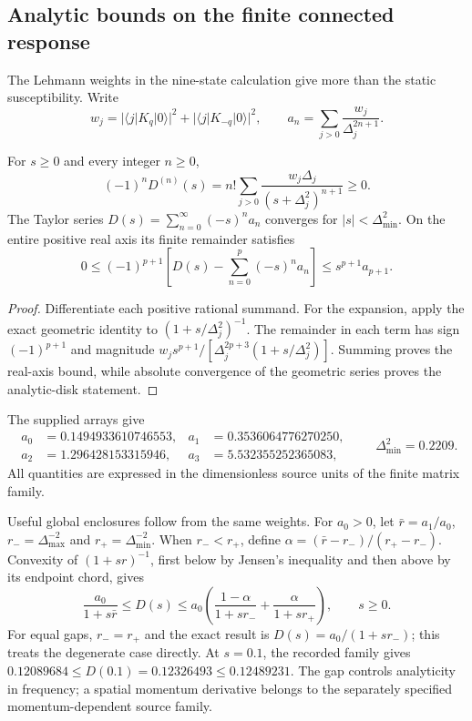 \subsection{Analytic bounds on the finite connected response}
\label{sec:response-bounds}
The Lehmann weights in the nine-state calculation give more than the static susceptibility. Write
\[
w_j=|\langle j|K_q|0\rangle|^2+|\langle j|K_{-q}|0\rangle|^2,
\qquad a_n=\sum_{j>0}\frac{w_j}{\Delta_j^{2n+1}}.
\]
\begin{proposition}\label{prop:stieltjes-response}
For $s\geq0$ and every integer $n\geq0$,
\begin{equation}\label{eq:response-monotonicity}
(-1)^nD^{(n)}(s)=n!\sum_{j>0}\frac{w_j\Delta_j}{(s+\Delta_j^2)^{n+1}}\geq0.
\end{equation}
The Taylor series $D(s)=\sum_{n=0}^\infty(-s)^na_n$ converges for $|s|<\Delta_{\min}^2$. On the entire positive real axis its finite remainder satisfies
\begin{equation}\label{eq:response-remainder}
0\leq(-1)^{p+1}\left[D(s)-\sum_{n=0}^p(-s)^na_n\right]
\leq s^{p+1}a_{p+1}.
\end{equation}
\end{proposition}
\begin{proof}
Differentiate each positive rational summand. For the expansion, apply the exact geometric identity to $(1+s/\Delta_j^2)^{-1}$. The remainder in each term has sign $(-1)^{p+1}$ and magnitude
$w_j s^{p+1}/[\Delta_j^{2p+3}(1+s/\Delta_j^2)]$.
Summing proves the real-axis bound, while absolute convergence of the geometric series proves the analytic-disk statement.
\end{proof}
The supplied arrays give
\begin{equation}\label{eq:response-taylor-numbers}
\begin{aligned}
a_0&=0.1494933610746553,&a_1&=0.3536064776270250,\\
a_2&=1.296428153315946,&a_3&=5.532355252365083,
\end{aligned}
\qquad \Delta_{\min}^2=0.2209.
\end{equation}
All quantities are expressed in the dimensionless source units of the finite matrix family.

Useful global enclosures follow from the same weights. For $a_0>0$, let $\bar r=a_1/a_0$, $r_-=\Delta_{\max}^{-2}$ and $r_+=\Delta_{\min}^{-2}$. When $r_-<r_+$, define $\alpha=(\bar r-r_-)/(r_+-r_-)$. Convexity of $(1+sr)^{-1}$, first below by Jensen's inequality and then above by its endpoint chord, gives
\begin{equation}\label{eq:response-jensen}
\frac{a_0}{1+s\bar r}\leq D(s)\leq
a_0\left(\frac{1-\alpha}{1+sr_-}+\frac{\alpha}{1+sr_+}\right),\qquad s\geq0.
\end{equation}
For equal gaps, $r_-=r_+$ and the exact result is $D(s)=a_0/(1+sr_-)$; this treats the degenerate case directly. At $s=0.1$, the recorded family gives $0.12089684\leq D(0.1)=0.12326493\leq0.12489231$. The gap controls analyticity in frequency; a spatial momentum derivative belongs to the separately specified momentum-dependent source family.

